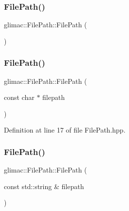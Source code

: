 \subsubsection{\texorpdfstring{File\+Path()}{FilePath()}\hspace{0.1cm}{\footnotesize\ttfamily [1/3]}}
{\footnotesize\ttfamily glimac\+::\+File\+Path\+::\+File\+Path (\begin{DoxyParamCaption}{ }\end{DoxyParamCaption})\hspace{0.3cm}{\ttfamily [default]}}

\mbox{\label{classglimac_1_1_file_path_aa049e2800413955e3e02c8ebae66be9f}} 
\subsubsection{\texorpdfstring{File\+Path()}{FilePath()}\hspace{0.1cm}{\footnotesize\ttfamily [2/3]}}
{\footnotesize\ttfamily glimac\+::\+File\+Path\+::\+File\+Path (\begin{DoxyParamCaption}\item[{const char $\ast$}]{filepath }\end{DoxyParamCaption})\hspace{0.3cm}{\ttfamily [inline]}}



Definition at line 17 of file File\+Path.\+hpp.

\mbox{\label{classglimac_1_1_file_path_a7add76a049f3232827af4393c734a3ad}} 
\subsubsection{\texorpdfstring{File\+Path()}{FilePath()}\hspace{0.1cm}{\footnotesize\ttfamily [3/3]}}
{\footnotesize\ttfamily glimac\+::\+File\+Path\+::\+File\+Path (\begin{DoxyParamCaption}\item[{const std\+::string \&}]{filepath }\end{DoxyParamCaption})\hspace{0.3cm}{\ttfamily [inline]}}



